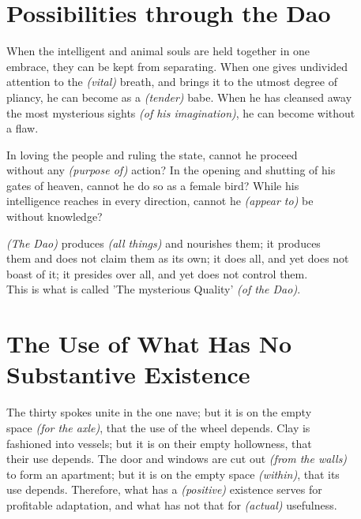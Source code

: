 \section*{Possibilities through the Dao}
    When the intelligent and animal souls are held together in one\\
    embrace, they can be kept from separating. When one gives undivided\\
    attention to the \textit{(vital)} breath, and brings it to the utmost degree of\\
    pliancy, he can become as a \textit{(tender)} babe. When he has cleansed away\\
    the most mysterious sights \textit{(of his imagination)}, he can become without\\
    a flaw.\vspace{\baselineskip}
    
    In loving the people and ruling the state, cannot he proceed\\
    without any \textit{(purpose of)} action? In the opening and shutting of his\\
    gates of heaven, cannot he do so as a female bird? While his\\
    intelligence reaches in every direction, cannot he \textit{(appear to)} be\\
    without knowledge?\vspace{\baselineskip}
    
    \textit{(The Dao)} produces \textit{(all things)} and nourishes them; it produces\\
    them and does not claim them as its own; it does all, and yet does not\\
    boast of it; it presides over all, and yet does not control them.\\
    This is what is called 'The mysterious Quality' \textit{(of the Dao)}.
    
\section*{The Use of What Has No Substantive Existence}
    The thirty spokes unite in the one nave; but it is on the empty\\
    space \textit{(for the axle)}, that the use of the wheel depends. Clay is\\
    fashioned into vessels; but it is on their empty hollowness, that\\
    their use depends. The door and windows are cut out \textit{(from the walls)}\\
    to form an apartment; but it is on the empty space \textit{(within)}, that its\\
    use depends. Therefore, what has a \textit{(positive)} existence serves for\\
    profitable adaptation, and what has not that for \textit{(actual)} usefulness.\vspace{\baselineskip}
    
